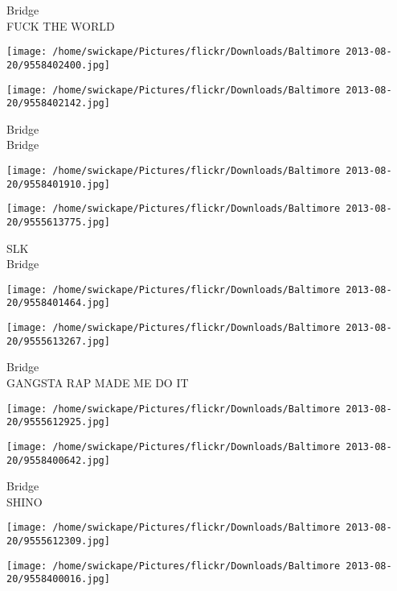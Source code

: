 \documentclass[10pt,letterpaper]{article}
\begin{document}
Bridge\\
FUCK THE WORLD\\
\pagebreak

\texttt{[image: /home/swickape/Pictures/flickr/Downloads/Baltimore 2013-08-20/9558402400.jpg]}

\vspace{0.25in}
\texttt{[image: /home/swickape/Pictures/flickr/Downloads/Baltimore 2013-08-20/9558402142.jpg]}

Bridge\\
Bridge\\
\pagebreak

\texttt{[image: /home/swickape/Pictures/flickr/Downloads/Baltimore 2013-08-20/9558401910.jpg]}

\vspace{0.25in}
\texttt{[image: /home/swickape/Pictures/flickr/Downloads/Baltimore 2013-08-20/9555613775.jpg]}

SLK\\
Bridge\\
\pagebreak

\texttt{[image: /home/swickape/Pictures/flickr/Downloads/Baltimore 2013-08-20/9558401464.jpg]}

\vspace{0.25in}
\texttt{[image: /home/swickape/Pictures/flickr/Downloads/Baltimore 2013-08-20/9555613267.jpg]}

Bridge\\
GANGSTA RAP MADE ME DO IT\\
\pagebreak

\texttt{[image: /home/swickape/Pictures/flickr/Downloads/Baltimore 2013-08-20/9555612925.jpg]}

\vspace{0.25in}
\texttt{[image: /home/swickape/Pictures/flickr/Downloads/Baltimore 2013-08-20/9558400642.jpg]}

Bridge\\
SHINO\\
\pagebreak

\texttt{[image: /home/swickape/Pictures/flickr/Downloads/Baltimore 2013-08-20/9555612309.jpg]}

\vspace{0.25in}
\texttt{[image: /home/swickape/Pictures/flickr/Downloads/Baltimore 2013-08-20/9558400016.jpg]}
\end{document}
